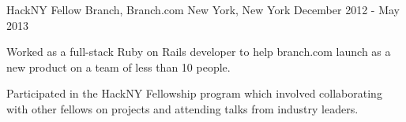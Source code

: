 \begin{cventries}

	\cventry
	{HackNY Fellow}
	{Branch, Branch.com}
	{New York, New York}
	{December 2012 - May 2013}
	{
		\begin{cvitems}
		\item {Worked as a full-stack Ruby on Rails developer to help branch.com launch as a new product on a team of less than 10 people.}
		\item {Participated in the HackNY Fellowship program which involved collaborating with other fellows on projects and attending talks from industry leaders.}
		\end{cvitems}
	}

\end{cventries}
